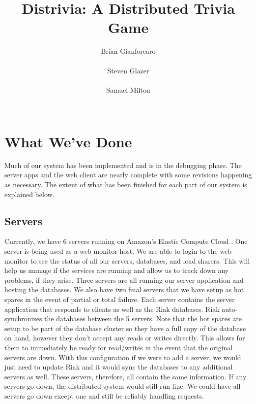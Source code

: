 \documentclass{dependencies/acm_proc_article-sp}
\begin{document}
\title{ Distrivia: A Distributed Trivia Game }
\author{
\alignauthor
Brian Gianforcaro \\
       \\
\alignauthor
Steven Glazer \\
       \\
\alignauthor
Samuel Milton \\
       \\
}
\maketitle


\section {What We've Done}
Much of our system has been implemented and is in the debugging phase. The server apps and the web client are nearly complete with some revisions happening as necessary. The extent of what has been finished for each part of our system is explained below.
\subsection {Servers}
Currently, we have 6 servers running on Amazon's Elastic Compute Cloud \cite{aec}. One server is being used as a web-monitor
host. We are able to login to the web-monitor to see the status of all our
servers, databases, and load sharers. This will help us manage if the services
are running and allow us to track down any problems, if they arise. Three
servers are all running our server application and hosting the databases.
We also have two final servers that we have setup as hot spares in the event
of partial or total failure.
Each server contains the server application that responds to clients as well as
the Riak \cite{riak} databases. Riak auto-synchronizes the databases between the 5 servers.
Note that the hot spares are setup to be part of the database cluster so they
have a full copy of the database on hand, however they don't accept any reads
or writes directly. This allows for them to immediately be ready for read/writes in the event that the original servers are down.
With this configuration if we were to add a server, we would just need to update 
Riak and it would sync the databases to any additional servers as well. These servers,
therefore, all contain the same information. If any servers go down, the distributed
system would still run fine. We could have all servers go down except one and still
be reliably handling requests.
\end{document}
